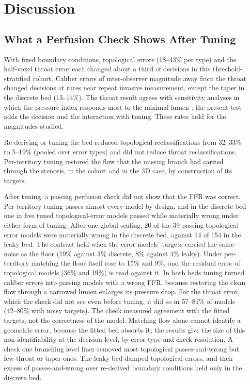 \documentclass[journal,twoside,web]{ieeecolor}
\begin{document}
\section{Discussion}
\subsection{What a Perfusion Check Shows After Tuning}
With fixed boundary conditions, topological errors (18--43\% per type) and the half-voxel throat error each changed about a third of decisions in this threshold-stratified cohort. Caliber errors of inter-observer magnitude away from the throat changed decisions at rates near repeat invasive measurement, except the taper in the discrete bed (13--14\%). The throat result agrees with sensitivity analyses in which the pressure index responds most to the minimal lumen \cite{sankaran2015tmi,fernandez2024}; the present test adds the decision and the interaction with tuning. These rates hold for the magnitudes studied.

Re-deriving or tuning the bed reduced topological reclassifications from 32--33\% to 5--19\% (pooled over error types) and did not reduce throat reclassifications. Per-territory
tuning restored the flow that the missing branch had carried through the stenosis, in the cohort and in the 3D case, by construction of its targets.

After tuning, a passing perfusion check did not show that the FFR was correct. Per-territory tuning passes
almost every model by design, and in the discrete bed one in five tuned topological-error models passed while
materially wrong under either form of tuning. After one global scaling, 20 of the 39 passing topological-error models were materially wrong in the discrete bed, against 14 of 154 in the leaky bed. The contrast held when the error models' targets carried the same noise as the floor (19\% against 3\% discrete, 8\% against 4\% leaky). Under per-territory matching the floor itself rose to 15\% and 9\%, and the residual error of topological models (36\% and 19\%) is read against it. In both beds tuning turned caliber errors into passing models with a wrong FFR, because restoring the clean flow through a narrowed lumen enlarges its pressure drop. For the throat error, which the check did not see even before tuning, it did so in 57--81\% of models (42--80\% with noisy targets). The check measured agreement with the fitted targets, not the correctness of the model. Matching flow alone cannot
identify a geometric error, because the fitted bed absorbs it; the results give the size of this non-identifiability at the decision level, by error type and check resolution. A check one
branching level finer removed most topological passes-and-wrong but few throat or taper ones. The leaky
bed damped topological errors, and their excess of passes-and-wrong over re-derived boundary conditions held only in
the discrete bed.
\end{document}
